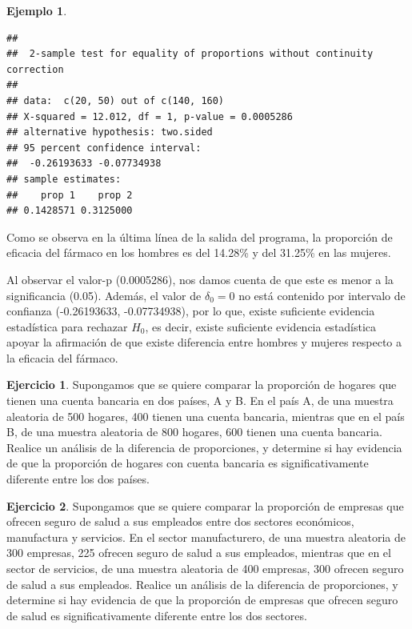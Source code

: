 \documentclass[
  11pt,
]{book}
\theoremstyle{definition}
\theoremstyle{definition}
\newtheorem{example}{Ejemplo}[chapter]
\theoremstyle{definition}
\newtheorem{exercise}{Ejercicio}[chapter]
\theoremstyle{definition}
\theoremstyle{remark}
\begin{document}
\begin{example}
\begin{verbatim}
## 
##  2-sample test for equality of proportions without continuity correction
## 
## data:  c(20, 50) out of c(140, 160)
## X-squared = 12.012, df = 1, p-value = 0.0005286
## alternative hypothesis: two.sided
## 95 percent confidence interval:
##  -0.26193633 -0.07734938
## sample estimates:
##    prop 1    prop 2 
## 0.1428571 0.3125000
\end{verbatim}

Como se observa en la última línea de la salida del programa, la proporción de eficacia del fármaco en los hombres es del 14.28\% y del 31.25\% en las mujeres.

Al observar el valor-p (0.0005286), nos damos cuenta de que este es menor a la significancia (0.05). Además, el valor de \(\delta_0 = 0\) no está contenido por intervalo de confianza (-0.26193633, -0.07734938), por lo que, existe suficiente evidencia estadística para rechazar \(H_0\), es decir, existe suficiente evidencia estadística apoyar la afirmación de que existe diferencia entre hombres y mujeres respecto a la eficacia del fármaco.
\end{example}

\begin{exercise}
Supongamos que se quiere comparar la proporción de hogares que tienen una cuenta bancaria en dos países, A y B. En el país A, de una muestra aleatoria de 500 hogares, 400 tienen una cuenta bancaria, mientras que en el país B, de una muestra aleatoria de 800 hogares, 600 tienen una cuenta bancaria. Realice un análisis de la diferencia de proporciones, y determine si hay evidencia de que la proporción de hogares con cuenta bancaria es significativamente diferente entre los dos países.
\end{exercise}

\begin{exercise}
Supongamos que se quiere comparar la proporción de empresas que ofrecen seguro de salud a sus empleados entre dos sectores económicos, manufactura y servicios. En el sector manufacturero, de una muestra aleatoria de 300 empresas, 225 ofrecen seguro de salud a sus empleados, mientras que en el sector de servicios, de una muestra aleatoria de 400 empresas, 300 ofrecen seguro de salud a sus empleados. Realice un análisis de la diferencia de proporciones, y determine si hay evidencia de que la proporción de empresas que ofrecen seguro de salud es significativamente diferente entre los dos sectores.
\end{exercise}
\end{document}
